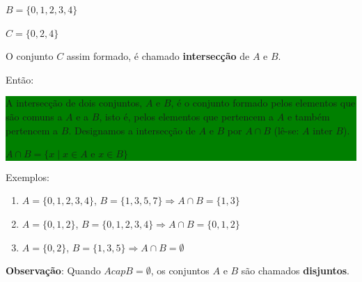 \documentclass[11pt, openright, a4paper, brazil, english, french, spanish, bibjustif, openany, oneside]{abntex2}
\begin{document}
\begin{SingleSpace}
\begin{center}
\begin{minipage}{.3\linewidth}
\begin{flushright}
$B=\{0, 1, 2, 3, 4\}$

\end{flushright}

\end{minipage}
\begin{minipage}{.2\linewidth}

\resizebox{3cm}{.4cm}{$\Rightarrow$}

\end{minipage}
\begin{minipage}{.3\linewidth}

\begin{flushleft}

$C=\{0, 2, 4\}$

\end{flushleft}

\end{minipage}

\end{center}

O conjunto $C$ assim formado, é chamado \textbf{intersecção} de $A$ e $B$.

Então:

\colorbox{green}
{
\begin{minipage}{14.7cm}

A intersecção de dois conjuntos, $A$ e $B$, é o conjunto formado pelos elementos que são comuns a $A$ e a $B$, isto é, pelos elementos que pertencem a $A$ e também pertencem a $B$.
Designamos a intersecção de $A$ e $B$ por $A \cap B$ (lê-se: $A$ inter $B$).

$A \cap B=\{x \mid x \in A$ e $x \in B\}$

\end{minipage}
}


Exemplos:

\begin{enumerate}[label=\alph*)]

\item $A=\{0, 1, 2, 3, 4\}$, $B=\{1, 3, 5, 7\} \Rightarrow A \cap B=\{1, 3\}$

\item $A=\{0, 1, 2\}$, $B=\{ 0, 1, 2, 3, 4\} \Rightarrow A \cap B=\{0, 1, 2\}$

\item $A=\{0, 2\}$, $B=\{1, 3, 5\} \Rightarrow A \cap B=\emptyset$

\end{enumerate}

\textbf{Observação}: Quando $A cap B = \emptyset$, os conjuntos $A$ e $B$ são chamados \textbf{disjuntos}.


\end{SingleSpace}
\end{document}
